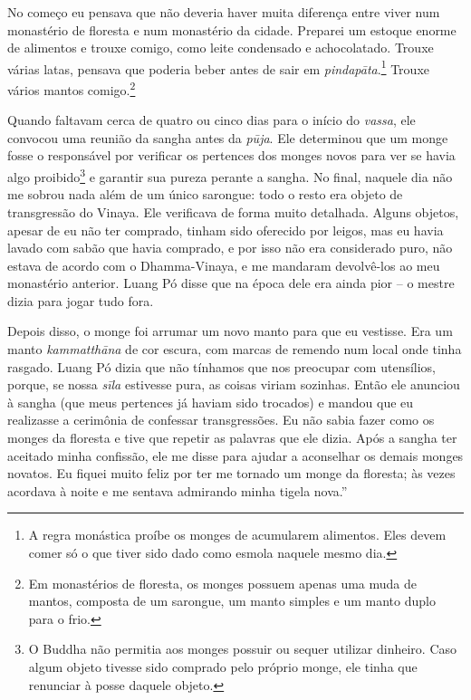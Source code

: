 No começo eu pensava que não deveria haver muita diferença entre viver
num monastério de floresta e num monastério da cidade. Preparei um
estoque enorme de alimentos e trouxe comigo, como leite condensado e
achocolatado. Trouxe várias latas, pensava que poderia beber antes de
sair em \emph{pindapāta}.\footnote{A regra monástica proíbe os monges de
  acumularem alimentos. Eles devem comer só o que tiver sido dado como
  esmola naquele mesmo dia.} Trouxe vários mantos comigo.\footnote{Em
  monastérios de floresta, os monges possuem apenas uma muda de mantos,
  composta de um sarongue, um manto simples e um manto duplo para o
  frio.}

Quando faltavam cerca de quatro ou cinco dias para o início do
\emph{vassa}, ele convocou uma reunião da sangha antes da \emph{pūja}.
Ele determinou que um monge fosse o responsável por verificar os
pertences dos monges novos para ver se havia algo proibido\footnote{O
  Buddha não permitia aos monges possuir ou sequer utilizar dinheiro.
  Caso algum objeto tivesse sido comprado pelo próprio monge, ele tinha
  que renunciar à posse daquele objeto.} e garantir sua pureza perante a
sangha. No final, naquele dia não me sobrou nada além de um único
sarongue: todo o resto era objeto de transgressão do Vinaya. Ele
verificava de forma muito detalhada. Alguns objetos, apesar de eu não
ter comprado, tinham sido oferecido por leigos, mas eu havia lavado com
sabão que havia comprado, e por isso não era considerado puro, não
estava de acordo com o Dhamma-Vinaya, e me mandaram devolvê-los ao meu
monastério anterior. Luang Pó disse que na época dele era ainda pior --
o mestre dizia para jogar tudo fora.

Depois disso, o monge foi arrumar um novo manto para que eu vestisse.
Era um manto \emph{kammatthāna} de cor escura, com marcas de remendo num
local onde tinha rasgado. Luang Pó dizia que não tínhamos que nos
preocupar com utensílios, porque, se nossa \emph{sīla} estivesse pura,
as coisas viriam sozinhas. Então ele anunciou à sangha (que meus
pertences já haviam sido trocados) e mandou que eu realizasse a
cerimônia de confessar transgressões. Eu não sabia fazer como os monges
da floresta e tive que repetir as palavras que ele dizia. Após a sangha
ter aceitado minha confissão, ele me disse para ajudar a aconselhar os
demais monges novatos. Eu fiquei muito feliz por ter me tornado um monge
da floresta; às vezes acordava à noite e me sentava admirando minha
tigela nova.''

